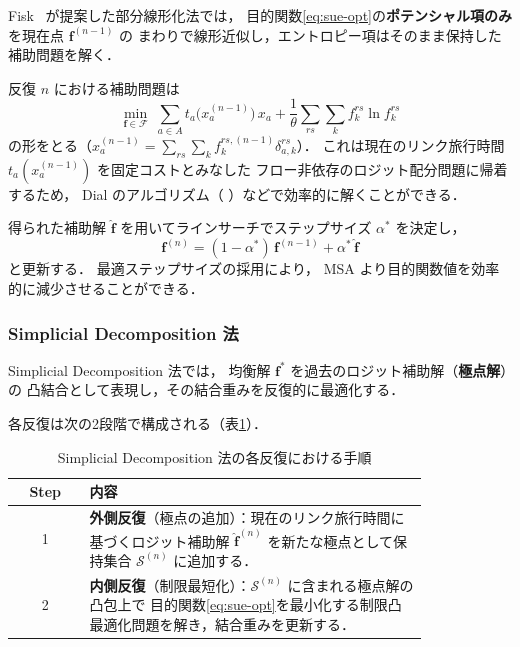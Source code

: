 Fisk~\cite{Fisk1980} が提案した部分線形化法では，
目的関数\eqref{eq:sue-opt}の\textbf{ポテンシャル項のみ}を現在点 $\boldsymbol{f}^{(n-1)}$ の
まわりで線形近似し，エントロピー項はそのまま保持した補助問題を解く．

反復 $n$ における補助問題は
\[
  \min_{\boldsymbol{f} \in \mathcal{F}}\;
    \sum_{a \in A} t_a\!\bigl(x_a^{(n-1)}\bigr)\, x_a
    + \frac{1}{\theta}
      \sum_{rs}\sum_k f_k^{rs} \ln f_k^{rs}
\]
の形をとる（$x_a^{(n-1)} = \sum_{rs}\sum_k f_k^{rs,(n-1)} \delta_{a,k}^{rs}$）．
これは現在のリンク旅行時間 $t_a(x_a^{(n-1)})$ を固定コストとみなした
フロー非依存のロジット配分問題に帰着するため，
Dial のアルゴリズム（ ）などで効率的に解くことができる\cite{Fisk1980}．

得られた補助解 $\hat{\boldsymbol{f}}$ を用いてラインサーチでステップサイズ $\alpha^*$ を決定し，
\[
  \boldsymbol{f}^{(n)}
    = (1 - \alpha^*)\,\boldsymbol{f}^{(n-1)}
      + \alpha^*\,\hat{\boldsymbol{f}}
\]
と更新する．
最適ステップサイズの採用により，
MSA より目的関数値を効率的に減少させることができる\cite{Fisk1980,Sheffi1985}．

\subsubsection*{Simplicial Decomposition 法}

Simplicial Decomposition 法では，
均衡解 $\boldsymbol{f}^*$ を過去のロジット補助解（\textbf{極点解}）の
凸結合として表現し，その結合重みを反復的に最適化する\cite{Sheffi1985}．

各反復は次の2段階で構成される（表\ref{tab:sd-algorithm}）．

\begin{table}[hbtp]
  \centering
  \caption{Simplicial Decomposition 法の各反復における手順}
  \label{tab:sd-algorithm}
  \begin{tabular}{cp{0.82\linewidth}}
    \toprule
    Step & 内容 \\
    \midrule
    1 & \textbf{外側反復}（極点の追加）：現在のリンク旅行時間に基づくロジット補助解
        $\hat{\boldsymbol{f}}^{(n)}$ を新たな極点として保持集合 $\mathcal{S}^{(n)}$ に追加する．
        \\[4pt]
    2 & \textbf{内側反復}（制限最短化）：$\mathcal{S}^{(n)}$ に含まれる極点解の凸包上で
        目的関数\eqref{eq:sue-opt}を最小化する制限凸最適化問題を解き，結合重みを更新する．
        \\
    \bottomrule
  \end{tabular}
\end{table}

